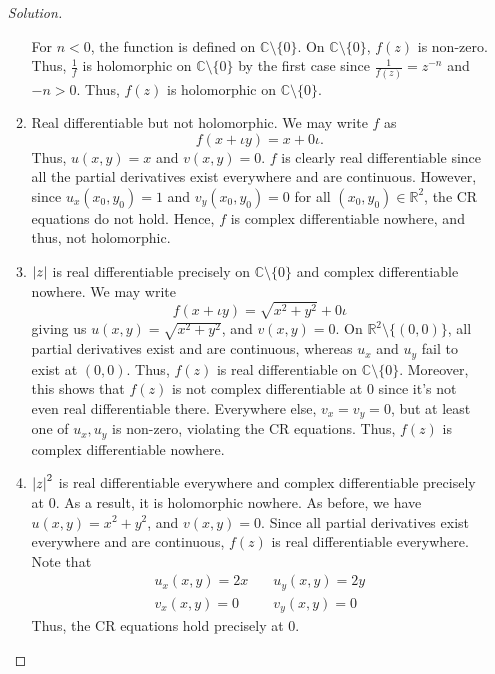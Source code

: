 \documentclass[11pt]{article}
\theoremstyle{definition}
\newenvironment{soln}{\begin{proof}[Solution]}{\end{proof}}
\begin{document}
\begin{enumerate}[leftmargin=*]
\begin{soln}
\begin{enumerate}
        \medskip
        
        For $n < 0$, the function is defined on $\mathbb{C} \setminus \{0\}$. On $\mathbb{C} \setminus \{0\}$, $f(z)$ is non-zero. Thus, $\frac{1}{f}$ is holomorphic on $\mathbb{C} \setminus \{0\}$ by the first case since $\frac{1}{f(z)} = z^{-n}$ and $-n > 0$. Thus, $f(z)$ is holomorphic on $\mathbb{C} \setminus \{0\}$.
        
        \item Real differentiable but not holomorphic. We may write $f$ as
        \[
            f(x+\iota y) = x + 0\iota.
        \]
        Thus, $u(x,y) = x$ and $v(x,y) = 0$. $f$ is clearly real differentiable since all the partial derivatives exist everywhere and are continuous. However, since $u_x(x_0,y_0) = 1$ and $v_y(x_0,y_0) = 0$ for all $(x_0,y_0) \in \mathbb{R}^2$, the CR equations do not hold. Hence, $f$ is complex differentiable nowhere, and thus, not holomorphic.
        
        \item $\abs{z}$ is real differentiable precisely on $\mathbb{C} \setminus \{0\}$ and complex differentiable nowhere. We may write
        \[
            f(x+\iota y) = \sqrt{x^2 + y^2} + 0\iota
        \]
        giving us $u(x,y) = \sqrt{x^2 + y^2}$, and $v(x,y) = 0$. On $\mathbb{R}^2\setminus\{(0,0)\}$, all partial derivatives exist and are continuous, whereas $u_x$ and $u_y$ fail to exist at $(0,0)$. Thus, $f(z)$ is real differentiable on $\mathbb{C} \setminus \{0\}$. Moreover, this shows that $f(z)$ is not complex differentiable at $0$ since it's not even real differentiable there. Everywhere else, $v_x = v_y = 0$, but at least one of $u_x, u_y$ is non-zero, violating the CR equations. Thus, $f(z)$ is complex differentiable nowhere.
        
        \item $\abs{z}^2$ is real differentiable everywhere and complex differentiable precisely at $0$. As a result, it is holomorphic nowhere. As before, we have $u(x,y) = x^2 + y^2$, and $v(x,y) = 0$. Since all partial derivatives exist everywhere and are continuous, $f(z)$ is real differentiable everywhere. Note that
        \begin{align*}
            u_x(x,y) = 2x &\quad u_y(x,y) = 2y \\
            v_x(x,y) = 0 &\quad v_y(x,y) = 0
        \end{align*}
        Thus, the CR equations hold precisely at $0$.
        

\end{enumerate}
\end{soln}
\end{enumerate}
\end{document}
